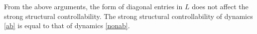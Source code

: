 \documentclass[a4paper,11pt]{article}
\begin{document}
{\begin{remark}
From the above arguments, the form of diagonal entries in $L$ does not affect the strong structural controllability. The strong structural controllability of dynamics \eqref{ab} is equal to that of dynamics \eqref{nonab}.
\end{remark}


}
\end{document}
